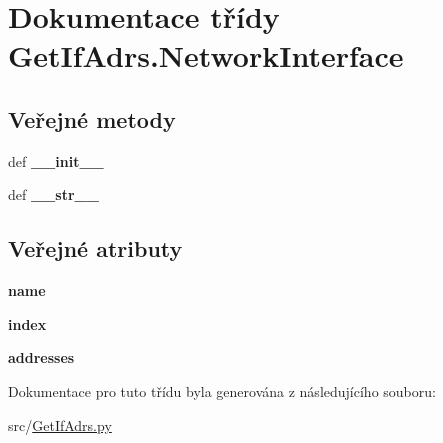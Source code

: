 \hypertarget{classGetIfAdrs_1_1NetworkInterface}{\section{Dokumentace třídy Get\-If\-Adrs.\-Network\-Interface}
\label{de/dfb/classGetIfAdrs_1_1NetworkInterface}
}
\subsection*{Veřejné metody}
\begin{DoxyCompactItemize}
\item 
\hypertarget{classGetIfAdrs_1_1NetworkInterface_a17045f163f7ea32f84f071a8fe4dc3da}{def {\bfseries \-\_\-\-\_\-init\-\_\-\-\_\-}}\label{de/dfb/classGetIfAdrs_1_1NetworkInterface_a17045f163f7ea32f84f071a8fe4dc3da}

\item 
\hypertarget{classGetIfAdrs_1_1NetworkInterface_af59ddf271fff23f70f0c12c0b7d238f7}{def {\bfseries \-\_\-\-\_\-str\-\_\-\-\_\-}}\label{de/dfb/classGetIfAdrs_1_1NetworkInterface_af59ddf271fff23f70f0c12c0b7d238f7}

\end{DoxyCompactItemize}
\subsection*{Veřejné atributy}
\begin{DoxyCompactItemize}
\item 
\hypertarget{classGetIfAdrs_1_1NetworkInterface_a2fa8fcd730a3938dd975fa9813d42a52}{{\bfseries name}}\label{de/dfb/classGetIfAdrs_1_1NetworkInterface_a2fa8fcd730a3938dd975fa9813d42a52}

\item 
\hypertarget{classGetIfAdrs_1_1NetworkInterface_a8985b52d915325de89e92b00b4110cd8}{{\bfseries index}}\label{de/dfb/classGetIfAdrs_1_1NetworkInterface_a8985b52d915325de89e92b00b4110cd8}

\item 
\hypertarget{classGetIfAdrs_1_1NetworkInterface_a2977c15005219565e7ace281fce740e5}{{\bfseries addresses}}\label{de/dfb/classGetIfAdrs_1_1NetworkInterface_a2977c15005219565e7ace281fce740e5}

\end{DoxyCompactItemize}


Dokumentace pro tuto třídu byla generována z následujícího souboru\-:\begin{DoxyCompactItemize}
\item 
src/\hyperlink{GetIfAdrs_8py}{Get\-If\-Adrs.\-py}\end{DoxyCompactItemize}

